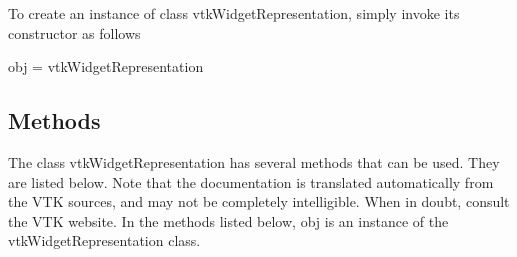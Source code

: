 To create an instance of class vtk\-Widget\-Representation, simply invoke its constructor as follows \begin{DoxyVerb}  obj = vtkWidgetRepresentation
\end{DoxyVerb}
 \hypertarget{vtkwidgets_vtkxyplotwidget_Methods}{}\subsection{Methods}\label{vtkwidgets_vtkxyplotwidget_Methods}
The class vtk\-Widget\-Representation has several methods that can be used. They are listed below. Note that the documentation is translated automatically from the V\-T\-K sources, and may not be completely intelligible. When in doubt, consult the V\-T\-K website. In the methods listed below, {\ttfamily obj} is an instance of the vtk\-Widget\-Representation class. 
